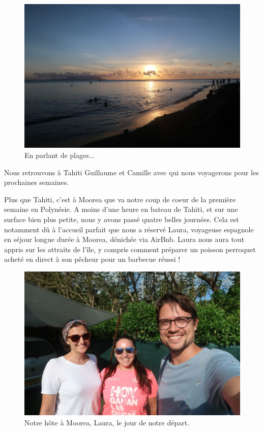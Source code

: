 \begin{figure}
\centering
\includegraphics{images/20180810_tahiti.JPG}
\caption{En parlant de plages...}
\end{figure}

Nous retrouvons à Tahiti Guillaume et Camille avec qui nous voyagerons
pour les prochaines semaines.

Plus que Tahiti, c'est à Moorea que va notre coup de coeur de la
première semaine en Polynésie. A moins d'une heure en bateau de Tahiti,
et sur une surface bien plus petite, nous y avons passé quatre belles
journées. Cela est notamment dû à l'accueil parfait que nous a réservé
Laura, voyageuse espagnole en séjour longue durée à Moorea, dénichée via
AirBnb. Laura nous aura tout appris sur les attraits de l'île, y compris
comment préparer un poisson perroquet acheté en direct à son pêcheur
pour un barbecue réussi !

\begin{figure}
\centering
\includegraphics{images/20180810_moorea_laura.JPG}
\caption{Notre hôte à Moorea, Laura, le jour de notre départ.}
\end{figure}

